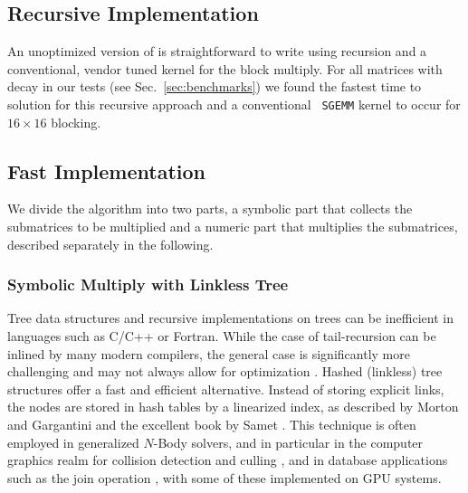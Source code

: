 \subsection{Recursive Implementation}
\label{sec:recursive_implementation}

An unoptimized version of \SpAMM{} is straightforward to write using recursion
and a conventional, vendor tuned kernel for the block multiply. For all
matrices with decay in our tests (see Sec.~\ref{sec:benchmarks}) we found the
fastest time to solution for this recursive approach and a conventional {\tt
SGEMM} kernel to occur for $16 \times 16$ blocking.

\subsection{Fast Implementation}
\label{sec:fast_implementation}

We divide the \SpAMM{} algorithm into two parts, a symbolic part that
collects the submatrices to be multiplied and a numeric part that multiplies
the submatrices, described separately in the following.

\subsubsection{Symbolic Multiply with Linkless Tree}
\label{sec:linkless_tree}

Tree data structures and recursive implementations on trees can be inefficient
in languages such as C/C++ or Fortran. While the case of tail-recursion can be
inlined by many modern compilers, the general case is significantly more
challenging and may not always allow for optimization
\cite{Stitt:2008:RF:1366110.1366143, Tang:2006:CIR:1185448.1185574}. Hashed
(linkless) tree structures offer a fast and efficient alternative. Instead of
storing explicit links, the nodes are stored in hash tables by a linearized
index, as described by Morton \cite{Morton66} and Gargantini
\cite{Gargantini1982} and the excellent book by Samet
\cite{Samet:1990:DAS:77589}. This technique is often employed in generalized
$N$-Body solvers, and in particular in the computer graphics realm for
collision detection and culling \cite{CGF:CGF1554, CGF:CGF1775,
Lefebvre:2006:PSH:1141911.1141926, Lefebvre:2006:PSH:1179352.1141926,
AVRIL:2009:HAL-00412870:1, Zou2008, 694268}, and in database applications such
as the join operation \cite{Amossen:2009:SpMMeqJoin,
Lieberman:2008:FSJ:1546682.1547260, Jacox:2003:ISJ:937598.937600, 4115860},
with some of these implemented on GPU systems.

